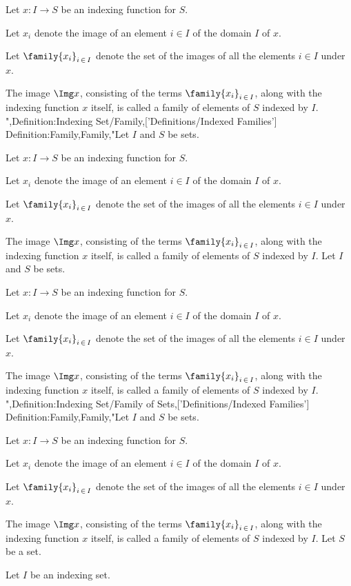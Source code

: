 Let $x: I \to S$ be an indexing function for $S$.

Let $x_i$ denote the image of an element $i \in I$ of the domain $I$ of $x$.

Let $\family {x_i}_{i \mathop \in I}$ denote the set of the images of all the elements $i \in I$ under $x$.


The image $\Img x$, consisting of the terms $\family {x_i}_{i \mathop \in I}$, along with the indexing function $x$ itself, is called a family of elements of $S$ indexed by $I$.
",Definition:Indexing Set/Family,['Definitions/Indexed Families']
Definition:Family,Family,"Let $I$ and $S$ be sets.

Let $x: I \to S$ be an indexing function for $S$.

Let $x_i$ denote the image of an element $i \in I$ of the domain $I$ of $x$.

Let $\family {x_i}_{i \mathop \in I}$ denote the set of the images of all the elements $i \in I$ under $x$.


The image $\Img x$, consisting of the terms $\family {x_i}_{i \mathop \in I}$, along with the indexing function $x$ itself, is called a family of elements of $S$ indexed by $I$.
Let $I$ and $S$ be sets.

Let $x: I \to S$ be an indexing function for $S$.

Let $x_i$ denote the image of an element $i \in I$ of the domain $I$ of $x$.

Let $\family {x_i}_{i \mathop \in I}$ denote the set of the images of all the elements $i \in I$ under $x$.


The image $\Img x$, consisting of the terms $\family {x_i}_{i \mathop \in I}$, along with the indexing function $x$ itself, is called a family of elements of $S$ indexed by $I$.
",Definition:Indexing Set/Family of Sets,['Definitions/Indexed Families']
Definition:Family,Family,"Let $I$ and $S$ be sets.

Let $x: I \to S$ be an indexing function for $S$.

Let $x_i$ denote the image of an element $i \in I$ of the domain $I$ of $x$.

Let $\family {x_i}_{i \mathop \in I}$ denote the set of the images of all the elements $i \in I$ under $x$.


The image $\Img x$, consisting of the terms $\family {x_i}_{i \mathop \in I}$, along with the indexing function $x$ itself, is called a family of elements of $S$ indexed by $I$.
Let $S$ be a set.

Let $I$ be an indexing set.

